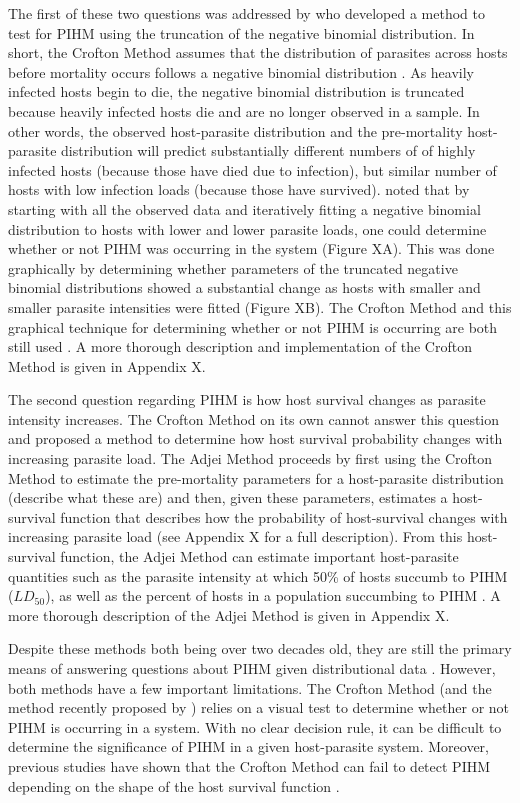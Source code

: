 \documentclass[12pt, a4paper]{article}
\begin{document}
The first of these two questions was addressed by \cite{Crofton1971a} who developed
a method to test for PIHM using the truncation of the negative binomial
distribution.  In short, the Crofton Method assumes that the distribution of
parasites across hosts before mortality occurs follows a negative binomial
distribution \citep{AndersonandMay1978,Shaw1998}.  As heavily infected hosts
begin to die, the negative binomial distribution is truncated because heavily
infected hosts die and are no longer observed in a sample. In other words, the
observed host-parasite distribution and the pre-mortality host-parasite
distribution will predict substantially different numbers of of highly infected
hosts (because those have died due to infection), but similar number of hosts with low infection
loads (because those have survived).  \citep{Crofton1971a} noted that by
starting with all the observed data and iteratively fitting a negative binomial
distribution to hosts with lower and lower parasite loads, one could determine
whether or not PIHM was occurring in the system (Figure XA).  This was done
graphically by determining whether parameters of the truncated negative binomial distributions showed a substantial change as hosts with smaller and smaller parasite intensities were fitted (Figure XB).  The Crofton Method and this graphical technique for determining whether or not PIHM is occurring are both still used \citep{Ferguson2011}. A more thorough description and implementation of the Crofton Method is given in Appendix X.

The second question regarding PIHM is how host survival changes as parasite
intensity increases. The Crofton Method on its own cannot answer this question
and \cite{Adjei1986} proposed a method to determine how host survival
probability changes with increasing parasite load.  The Adjei Method proceeds
by first using the Crofton Method to estimate the pre-mortality parameters for
a host-parasite distribution (describe what these are) and then, given these
parameters, estimates a host-survival function that describes how the
probability of host-survival changes with increasing parasite load (see
Appendix X for a full description).  From this host-survival function, the
Adjei Method can estimate important host-parasite quantities such as the
parasite intensity at which 50\% of hosts succumb to PIHM ($LD_{50}$), as well
as the percent of hosts in a population succumbing to PIHM \citep{Adjei1986}. A more thorough description of the Adjei Method is given in Appendix X.

Despite these methods both being over two decades old, they are still the
primary means of answering questions about PIHM given distributional data
\citep[\cite{Royce1990} but see][for an alternative to the Crofton
Method]{Ferguson2011}. However, both methods have a few important limitations.
The Crofton Method (and the method recently proposed by \cite{Ferguson2011})
relies on a visual test to determine whether or not PIHM is occurring in a
system.  With no clear decision rule, it can be difficult to determine the
significance of PIHM in a given host-parasite system.  Moreover, previous
studies have shown that the Crofton Method can fail to detect PIHM depending on
the shape of the host survival function \citep{Lanciani1989}.
\end{document}
